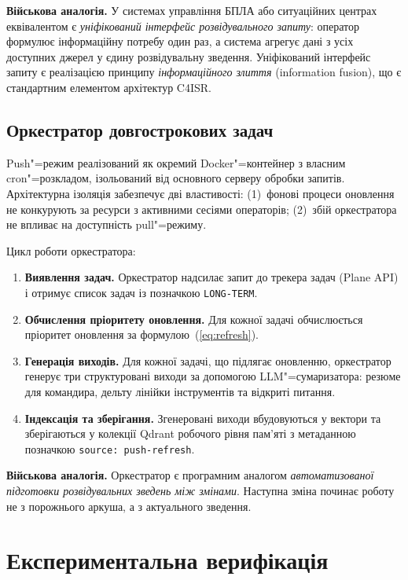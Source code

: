 \documentclass[11pt]{article}
\begin{document}
\textbf{Військова аналогія.}
У системах управління БПЛА або ситуаційних центрах еквівалентом є \emph{уніфікований інтерфейс розвідувального запиту}: оператор формулює інформаційну потребу один раз, а система агрегує дані з усіх доступних джерел у єдину розвідувальну зведення.
Уніфікований інтерфейс запиту є реалізацією принципу \emph{інформаційного злиття} (information fusion), що є стандартним елементом архітектур C4ISR.

\subsection{Оркестратор довгострокових задач}
\label{sec:orchestrator}

Push"=режим реалізований як окремий Docker"=контейнер з власним cron"=розкладом, ізольований від основного серверу обробки запитів.
Архітектурна ізоляція забезпечує дві властивості: (1)~фонові процеси оновлення не конкурують за ресурси з активними сесіями операторів; (2)~збій оркестратора не впливає на доступність pull"=режиму.

Цикл роботи оркестратора:
\begin{enumerate}[nosep]
  \item \textbf{Виявлення задач.} Оркестратор надсилає запит до трекера задач (Plane API) і отримує список задач із позначкою \texttt{LONG-TERM}.
  \item \textbf{Обчислення пріоритету оновлення.} Для кожної задачі обчислюється пріоритет оновлення за формулою~(\ref{eq:refresh}).
  \item \textbf{Генерація виходів.} Для кожної задачі, що підлягає оновленню, оркестратор генерує три структуровані виходи за допомогою LLM"=сумаризатора: резюме для командира, дельту лінійки інструментів та відкриті питання.
  \item \textbf{Індексація та зберігання.} Згенеровані виходи вбудовуються у вектори та зберігаються у колекції Qdrant робочого рівня пам'яті з метаданною позначкою \texttt{source:\,push-refresh}.
\end{enumerate}

\textbf{Військова аналогія.}
Оркестратор є програмним аналогом \emph{автоматизованої підготовки розвідувальних зведень між змінами}.
Наступна зміна починає роботу не з порожнього аркуша, а з актуального зведення.


\section{Експериментальна верифікація}
\label{sec:evaluation}
\end{document}
